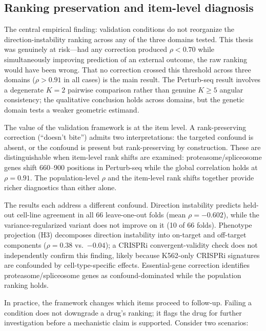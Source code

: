 \documentclass[11pt]{article}
\begin{document}
\subsection{Ranking preservation and item-level diagnosis}

The central empirical finding: validation conditions do not reorganize the
direction-instability ranking across any of the three domains tested. This
thesis was genuinely at risk---had any correction produced $\rho < 0.70$
while simultaneously improving prediction of an external outcome, the raw
ranking would have been wrong. That no correction crossed this threshold
across three domains ($\rho > 0.91$ in all cases) is the main result.
The Perturb-seq result involves a degenerate $K = 2$ pairwise comparison
rather than genuine $K \geq 5$ angular consistency; the qualitative
conclusion holds across domains, but the genetic domain tests a weaker
geometric estimand.

The value of the validation framework is at the item level. A
rank-preserving correction (``doesn't bite'') admits two interpretations:
the targeted confound is absent, or the confound is present but
rank-preserving by construction. These are distinguishable when item-level
rank shifts are examined: proteasome/spliceosome genes shift 660--900
positions in Perturb-seq while the global correlation holds at $\rho =
0.91$. The population-level $\rho$ and the item-level rank shifts together
provide richer diagnostics than either alone.

The results each address a different confound.
Direction instability predicts held-out cell-line agreement in all 66
leave-one-out folds (mean $\rho = -0.602$), while the variance-regularized
variant does not improve on it (10 of 66 folds).
Phenotype projection (H3) decomposes direction instability into on-target
and off-target components ($\rho = 0.38$ vs.\ $-0.04$); a CRISPRi
convergent-validity check does not independently confirm this finding,
likely because K562-only CRISPRi signatures are confounded by
cell-type-specific effects. Essential-gene correction identifies
proteasome/spliceosome genes as confound-dominated while the population
ranking holds.

In practice, the framework changes which items proceed to follow-up.
Failing a condition does not downgrade a drug's ranking; it flags the drug
for further investigation before a mechanistic claim is supported.
Consider two scenarios:
\end{document}
